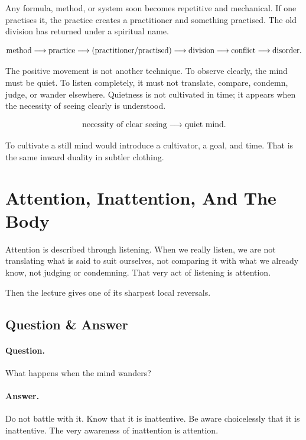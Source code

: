 \documentclass[11pt,oneside]{book}
\begin{document}
Any formula, method, or system soon becomes repetitive and mechanical. If one practises it, the practice creates a practitioner and something practised. The old division has returned under a spiritual name.

\begin{equation}
\hbox{method}
\longrightarrow
\hbox{practice}
\longrightarrow
(\hbox{practitioner}/\hbox{practised})
\longrightarrow
\hbox{division}
\longrightarrow
\hbox{conflict}
\longrightarrow
\hbox{disorder}.
\end{equation}

The positive movement is not another technique. To observe clearly, the mind must be quiet. To listen completely, it must not translate, compare, condemn, judge, or wander elsewhere. Quietness is not cultivated in time; it appears when the necessity of seeing clearly is understood.

\begin{equation}
\hbox{necessity of clear seeing}
\longrightarrow
\hbox{quiet mind}.
\end{equation}

To cultivate a still mind would introduce a cultivator, a goal, and time. That is the same inward duality in subtler clothing.

\section{Attention, Inattention, And The Body}

Attention is described through listening. When we really listen, we are not translating what is said to suit ourselves, not comparing it with what we already know, not judging or condemning. That very act of listening is attention.

Then the lecture gives one of its sharpest local reversals.

\subsection{Question \& Answer}

\paragraph{Question.}
What happens when the mind wanders?

\paragraph{Answer.}
Do not battle with it. Know that it is inattentive. Be aware choicelessly that it is inattentive. The very awareness of inattention is attention.
\end{document}
